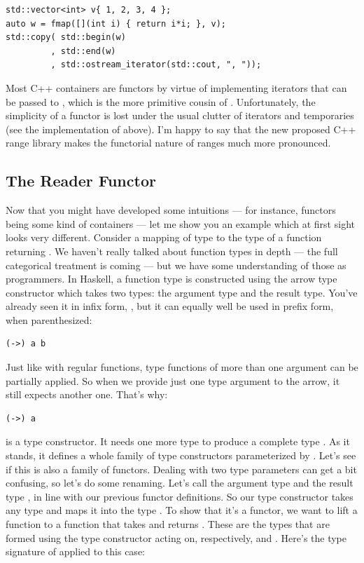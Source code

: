 \begin{Verbatim}
std::vector<int> v{ 1, 2, 3, 4 };
auto w = fmap([](int i) { return i*i; }, v);
std::copy( std::begin(w)
         , std::end(w)
         , std::ostream_iterator(std::cout, ", "));
\end{Verbatim}
Most C++ containers are functors by virtue of implementing iterators
that can be passed to , which is the more
primitive cousin of . Unfortunately, the simplicity of a
functor is lost under the usual clutter of iterators and temporaries
(see the implementation of  above). I'm happy to say that
the new proposed C++ range library makes the functorial nature of ranges
much more pronounced.

\subsection{The Reader Functor}

Now that you might have developed some intuitions --- for instance,
functors being some kind of containers --- let me show you an example
which at first sight looks very different. Consider a mapping of type
 to the type of a function returning . We haven't
really talked about function types in depth --- the full categorical
treatment is coming --- but we have some understanding of those as
programmers. In Haskell, a function type is constructed using the arrow
type constructor \code{(->)} which takes two types: the
argument type and the result type. You've already seen it in infix form,
, but it can equally well be used in prefix
form, when parenthesized:

\begin{Verbatim}
(->) a b
\end{Verbatim}
Just like with regular functions, type functions of more than one
argument can be partially applied. So when we provide just one type
argument to the arrow, it still expects another one. That's why:

\begin{Verbatim}
(->) a
\end{Verbatim}
is a type constructor. It needs one more type  to produce a
complete type . As it stands, it defines a
whole family of type constructors parameterized by . Let's see
if this is also a family of functors. Dealing with two type parameters
can get a bit confusing, so let's do some renaming. Let's call the
argument type  and the result type , in line with
our previous functor definitions. So our type constructor takes any type
 and maps it into the type . To show
that it's a functor, we want to lift a function
 to a function that takes
 and returns . These
are the types that are formed using the type constructor
 acting on, respectively,  and
. Here's the type signature of  applied to this
case:

